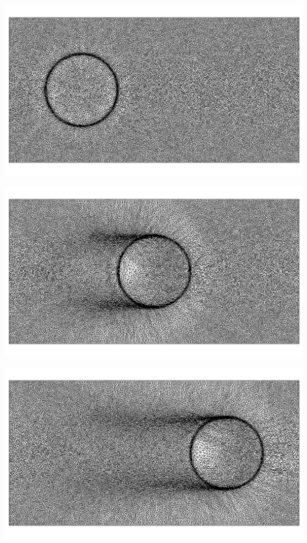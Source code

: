 \begingroup
	\begin{minipage}[t]{.5\linewidth}
		\centering
		 \includegraphics[scale=.15]{Bordeaux/figures/LSAdvection/CircleAdvNew0.png}
	\end{minipage}
	\begin{minipage}[t]{.5\linewidth}
		\centering
		 \includegraphics[scale=.15]{Bordeaux/figures/LSAdvection/CircleAdvNew10.png}
	\end{minipage}
	\begin{minipage}[t]{1.\linewidth}
		\centering
		 \includegraphics[scale=.15]{Bordeaux/figures/LSAdvection/CircleAdvNew20.png}
	\end{minipage}
\endgroup

